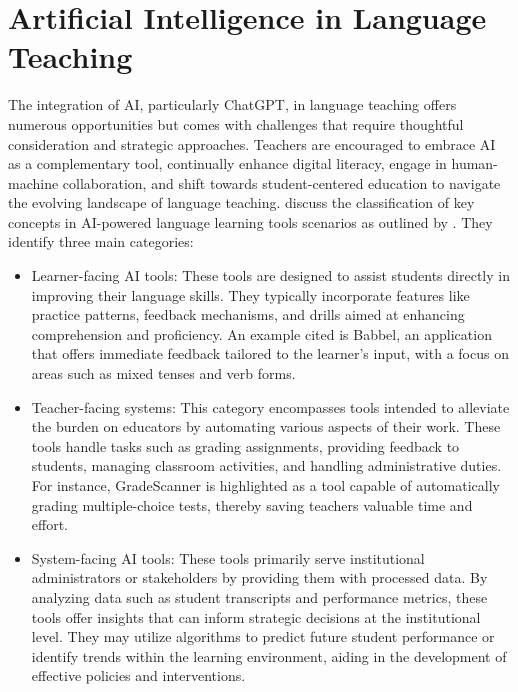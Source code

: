 \section{Artificial Intelligence in Language Teaching}\label{sec-artificialintelligencein}
The integration of AI, particularly ChatGPT, in language teaching offers
numerous opportunities but comes with challenges that require thoughtful
consideration and strategic approaches. Teachers are encouraged to
embrace AI as a complementary tool, continually enhance digital
literacy, engage in human-machine collaboration, and shift towards
student-centered education to navigate the evolving landscape of
language teaching. \textcite[p.~167]{schmidt2022} discuss the
classification of key concepts in AI-powered language learning tools
scenarios as outlined by \textcite{baker2019}. They identify three
main categories:

\begin{itemize}
    \item Learner-facing AI tools: These tools are designed to assist students directly in improving their language skills. They typically incorporate features like practice patterns, feedback mechanisms, and drills aimed at enhancing comprehension and proficiency. An example cited is Babbel, an application that offers immediate feedback tailored to the learner's input, with a focus on areas such as mixed tenses and verb forms.
    \item Teacher-facing systems: This category encompasses tools intended to alleviate the burden on educators by automating various aspects of their work. These tools handle tasks such as grading assignments, providing feedback to students, managing classroom activities, and handling administrative duties. For instance, GradeScanner is highlighted as a tool capable of automatically grading multiple-choice tests, thereby saving teachers valuable time and effort.
    \item System-facing AI tools: These tools primarily serve institutional administrators or stakeholders by providing them with processed data. By analyzing data such as student transcripts and performance metrics, these tools offer insights that can inform strategic decisions at the institutional level. They may utilize algorithms to predict future student performance or identify trends within the learning environment, aiding in the development of effective policies and interventions.
\end{itemize}


